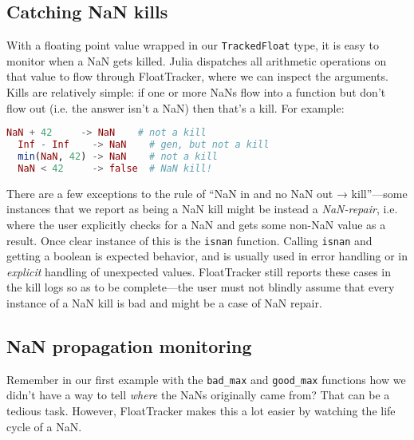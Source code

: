 \documentclass{juliacon}
\begin{document}
%

\subsection{Catching NaN kills}

With a floating point value wrapped in our \texttt{TrackedFloat} type, it is easy to monitor when a NaN gets killed.
Julia dispatches all arithmetic operations on that value to flow through FloatTracker, where we can inspect the arguments.
Kills are relatively simple: if one or more NaNs flow into a function but don't flow out (i.e. the answer isn't a NaN) then that's a kill.
For example:

\begin{lstlisting}[language = Julia]
  NaN + 42     -> NaN    # not a kill
  Inf - Inf    -> NaN    # gen, but not a kill
  min(NaN, 42) -> NaN    # not a kill
  NaN < 42     -> false  # NaN kill!
\end{lstlisting}

There are a few exceptions to the rule of ``NaN in and no NaN out → kill''---some instances that we report as being a NaN kill might be instead a \emph{NaN-repair}, i.e. where the user explicitly checks for a NaN and gets some non-NaN value as a result.
Once clear instance of this is the \texttt{isnan} function.
Calling \texttt{isnan} and getting a boolean is expected behavior, and is usually used in error handling or in \emph{explicit} handling of unexpected values.
FloatTracker still reports these cases in the kill logs so as to be complete---the user must not blindly assume that every instance of a NaN kill is bad and might be a case of NaN repair.


\subsection{NaN propagation monitoring}

Remember in our first example with the \texttt{bad\_max} and \texttt{good\_max} functions how we didn't have a way to tell \emph{where} the NaNs originally came from?
That can be a tedious task.
However, FloatTracker makes this a lot easier by watching the life cycle of a NaN.

\end{document}
